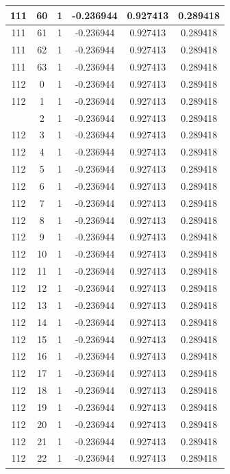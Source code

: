 \documentclass[12pt,a4paper]{article}
\numberwithin{equation}{section}
\numberwithin{figure}{section}
\numberwithin{table}{section}
\begin{document}
\begin{longtable}{|c|c|c|c|c|c|}
111 & 60 & 1 & -0.236944 & 0.927413 & 0.289418 \\ \hline
111 & 61 & 1 & -0.236944 & 0.927413 & 0.289418 \\ \hline
111 & 62 & 1 & -0.236944 & 0.927413 & 0.289418 \\ \hline
111 & 63 & 1 & -0.236944 & 0.927413 & 0.289418 \\ \hline
112 & 0 & 1 & -0.236944 & 0.927413 & 0.289418 \\ \hline
112 & 1 & 1 & -0.236944 & 0.927413 & 0.289418 \\ \hline
\pagebreak
112 & 2 & 1 & -0.236944 & 0.927413 & 0.289418 \\ \hline
112 & 3 & 1 & -0.236944 & 0.927413 & 0.289418 \\ \hline
112 & 4 & 1 & -0.236944 & 0.927413 & 0.289418 \\ \hline
112 & 5 & 1 & -0.236944 & 0.927413 & 0.289418 \\ \hline
112 & 6 & 1 & -0.236944 & 0.927413 & 0.289418 \\ \hline
112 & 7 & 1 & -0.236944 & 0.927413 & 0.289418 \\ \hline
112 & 8 & 1 & -0.236944 & 0.927413 & 0.289418 \\ \hline
112 & 9 & 1 & -0.236944 & 0.927413 & 0.289418 \\ \hline
112 & 10 & 1 & -0.236944 & 0.927413 & 0.289418 \\ \hline
112 & 11 & 1 & -0.236944 & 0.927413 & 0.289418 \\ \hline
112 & 12 & 1 & -0.236944 & 0.927413 & 0.289418 \\ \hline
112 & 13 & 1 & -0.236944 & 0.927413 & 0.289418 \\ \hline
112 & 14 & 1 & -0.236944 & 0.927413 & 0.289418 \\ \hline
112 & 15 & 1 & -0.236944 & 0.927413 & 0.289418 \\ \hline
112 & 16 & 1 & -0.236944 & 0.927413 & 0.289418 \\ \hline
112 & 17 & 1 & -0.236944 & 0.927413 & 0.289418 \\ \hline
112 & 18 & 1 & -0.236944 & 0.927413 & 0.289418 \\ \hline
112 & 19 & 1 & -0.236944 & 0.927413 & 0.289418 \\ \hline
112 & 20 & 1 & -0.236944 & 0.927413 & 0.289418 \\ \hline
112 & 21 & 1 & -0.236944 & 0.927413 & 0.289418 \\ \hline
112 & 22 & 1 & -0.236944 & 0.927413 & 0.289418 \\ \hline

\end{longtable}
\end{document}
